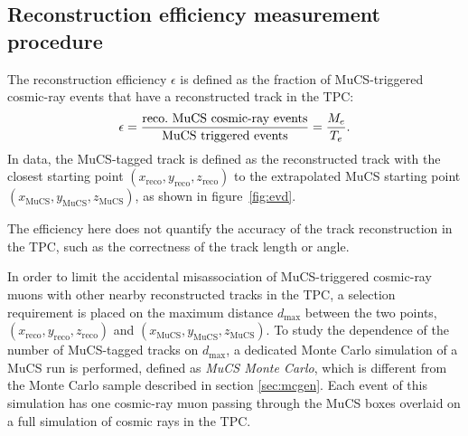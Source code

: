 \documentclass[a4paper,11pt]{article}
\def\myhyphen{{\hbox{-}}}
\begin{document}
\subsection{Reconstruction efficiency measurement procedure}\label{sec:procedure}
The reconstruction efficiency $\epsilon$ is defined as the fraction of MuCS-triggered cosmic-ray events that have a reconstructed track in the TPC:
\begin{equation}\label{eq:eff}
  \epsilon = \frac{\mathrm{reco.~MuCS~cosmic\myhyphen ray~events}}{\mathrm{MuCS~triggered~events}}=\frac{M_{e}}{T_{e}}.
\end{equation}
In data, the MuCS-tagged track is defined as the reconstructed track with the closest starting point $(x_{\mathrm{reco}},y_{\mathrm{reco}},z_{\mathrm{reco}})$ to the extrapolated MuCS starting point $(x_{\mathrm{MuCS}},y_{\mathrm{MuCS}},z_{\mathrm{MuCS}})$, as shown in figure~\ref{fig:evd}. %

The efficiency here does not quantify the accuracy of the track reconstruction in the TPC, such as the correctness of the track length or angle.

In order to limit the accidental misassociation of MuCS-triggered cosmic-ray muons with other nearby reconstructed tracks in the TPC, a selection requirement is placed on the maximum distance $d_{\mathrm{max}}$ between the two points, $(x_{\mathrm{reco}},y_{\mathrm{reco}},z_{\mathrm{reco}})$ and $(x_{\mathrm{MuCS}},y_{\mathrm{MuCS}},z_{\mathrm{MuCS}})$.
To study the dependence of the number of MuCS-tagged tracks on $d_{\mathrm{max}}$, a dedicated Monte Carlo simulation of a MuCS run is performed, defined as \emph{MuCS Monte Carlo}, which is different from the Monte Carlo sample described in section \ref{sec:mcgen}. Each event of this simulation has one cosmic-ray muon passing through the MuCS boxes overlaid on a full simulation of cosmic rays in the TPC.%
\end{document}
